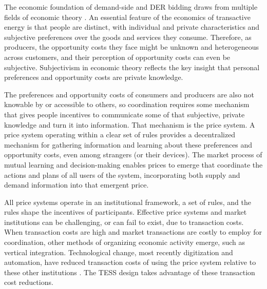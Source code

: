 The economic foundation of demand-side and DER bidding draws from multiple fields of economic theory \citep{kiesling_2021}. An essential feature of the economics of transactive energy is that people are distinct, with individual and private characteristics and subjective preferences over the goods and services they consume. Therefore, as producers, the opportunity costs they face might be unknown and heterogeneous across customers, and their perception of opportunity costs can even be subjective. Subjectivism in economic theory reflects the key insight that personal preferences and opportunity costs are private knowledge.

The preferences and opportunity costs of consumers and producers are also not knowable by or accessible to others, so coordination requires some mechanism that gives people incentives to communicate some of that subjective, private knowledge and turn it into information. That mechanism is the price system. A price system operating within a clear set of rules provides a decentralized mechanism for gathering information and learning about these preferences and opportunity costs, even among strangers (or their devices). The market process of mutual learning and decision-making enables prices to emerge that coordinate the actions and plans of all users of the system, incorporating both supply and demand information into that emergent price.

All price systems operate in an institutional framework, a set of rules, and the rules shape the incentives of participants. Effective price systems and market institutions can be challenging, or can fail to exist, due to transaction costs. When transaction costs are high and market transactions are costly to employ for coordination, other methods of organizing economic activity emerge, such as vertical integration. Technological change, most recently digitization and automation, have reduced transaction costs of using the price system relative to these other institutions \citep{kiesling_2016}. The TESS design takes advantage of these transaction cost reductions.

